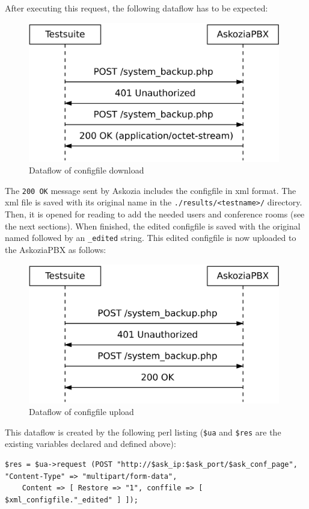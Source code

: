 After executing this request, the following dataflow has to be expected:
\begin{figure} [h!]
\centering
\includegraphics [width=11cm] {config-2}
\caption {Dataflow of configfile download}
\end{figure}

The \texttt{200 OK} message sent by Askozia includes the configfile in xml format. The xml file is saved with its original name
in the \texttt{./results/<testname>/} directory. Then, it is opened for reading to add the needed users and conference rooms
(see the next sections). When finished, the edited configfile is saved with the original named followed by an \texttt{\_edited}
string. This edited configfile is now uploaded to the AskoziaPBX as follows:

\begin{figure} [htbp]
\centering
\includegraphics [width=11cm] {config-3}
\caption {Dataflow of configfile upload}
\end{figure}

This dataflow is created by the following perl listing (\texttt{\$ua} and \texttt{\$res} are the existing variables declared and defined above):

\begin{lstlisting}[breaklines=true,label=code:config-post-request-upload,caption={POST request for uploading configfile} ]
$res = $ua->request (POST "http://$ask_ip:$ask_port/$ask_conf_page", "Content-Type" => "multipart/form-data",
    Content => [ Restore => "1", conffile => [ $xml_configfile."_edited" ] ]);
\end{lstlisting}

